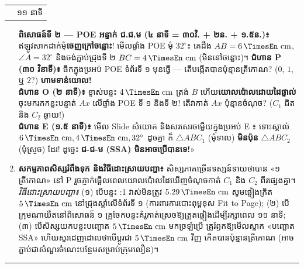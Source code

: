 \documentclass[a4paper,12pt]{article}
\makeatletter
\newcommand{\en}[1]{{\TimesEn #1}}
\newcommand{\enbf}[1]{{\TimesEn\textbf{#1}}}
\newcommand{\unit}[1]{\,\text{\en{#1}}}
\newcommand{\tri}[1]{\ensuremath{\triangle #1}}
\newcommand{\ang}[1]{\ensuremath{\angle #1}}
\newenvironment{phasebox}[3]{%
  \needspace{2.2cm}%
  \begin{tcolorbox}[
    enhanced, sharp corners, colback=headgray, colframe=black,
    boxrule=1.0pt, top=4pt, bottom=4pt, left=9pt, right=9pt,
    before skip=7pt, after skip=3pt
  ]%
    \renewcommand{\arraystretch}{1.0}%
    \begin{tabular*}{\linewidth}{@{}>{\raggedright\arraybackslash}p{13.60cm}@{\extracolsep{\fill}}r@{}}
      {\muol\fontsize{11pt}{17.5pt}\selectfont #1} & {\fontsize{10.5pt}{15pt}\selectfont\en{#2 |} #3}%
    \end{tabular*}%
  \end{tcolorbox}%
  \begingroup\fontsize{11.5pt}{18.2pt}\selectfont
}{%
  \par\endgroup\vspace{3pt}\hrule height 0.5pt\vspace{5pt}%
}
\makeatother
\begin{document}
\begin{phasebox}{ជំហានទី ៣ \enbf{(}ក\enbf{)} \enbf{--- E2 Explore}៖ ពិសោធន៍ទី ១ ចង្កឹះគន្លឹះ \enbf{\&} ពិសោធន៍ទី ២ \enbf{POE} អន្ទាក់ \enbf{SSA}}{11--22 min}{១១ នាទី}
\begin{enumerate}[leftmargin=0.45cm, topsep=2pt, itemsep=4pt, parsep=0pt]
\begin{scriptbox}
        \textbf{ពិសោធន៍ទី ២ — \en{POE} អន្ទាក់ ជ.ជ.ម (៤ នាទី = ៣០វិ. + ២ន. + ១.៥ន.)៖} ឥឡូវសាកដាក់មុំ\textbf{ចេញក្រៅចន្លោះ}! មើលផ្ទាំង \en{POE} មុំ $32^\circ$៖ គេដឹង $AB = 6\unit{cm}$, $\ang{A} = 32^\circ$ និងចង់ភ្ជាប់ជ្រុងទី ២ $BC = 4\unit{cm}$ (មិននៅចន្លោះ)។ \textbf{ជំហាន P (៣០ វិនាទី)៖} ធីកក្នុងប្រអប់ \en{POE} ទំព័រទី ១ មុនធ្វើ — តើបង្កើតបានប៉ុន្មានត្រីកោណ? ($0$, $1$, ឬ $2$?) \textbf{ហាមទាន់យោល!} \\
        \textbf{ជំហាន O (២ នាទី)៖} ខ្ទាស់បន្ទះ $4\unit{cm}$ ត្រង់ $B$ ហើយ\textbf{យោលប៉ោលដោយដៃផ្ទាល់}ចុះមករកកន្លះបន្ទាត់ $Ax$ លើផ្ទាំង \en{POE} ទី ១ និងទី ២! តើវាកាត់ $Ax$ ប៉ុន្មានចំណុច? ($C_1$ ជិត និង $C_2$ ឆ្ងាយ!) \\
        \textbf{ជំហាន E (១.៥ នាទី)៖} មើល \en{Slide} សំយោគ និងសរសេរចម្លើយក្នុងប្រអប់ \en{E} ៖ ទោះស្គាល់ $6\unit{cm}, 4\unit{cm}, 32^\circ$ ដូចគ្នា ក៏ $\tri{ABC_1}$ (មុំទាល) \textbf{មិនប៉ុន} $\tri{ABC_2}$ (មុំស្រួច) ដែរ! ដូច្នេះ \textbf{ជ-ជ-ម (\en{SSA}) មិនអាចប្រើបានទេ!}»
      \end{scriptbox}
    \item \textbf{សកម្មភាពសិស្សរំពឹងទុក និងវិធីដោះស្រាយបញ្ហា៖} សិស្សភាគច្រើនទស្សន៍ទាយថាបាន «១ ត្រីកោណ» នៅ \en{P} រួចភ្ញាក់ផ្អើលពេលយោលប៉ោលដៃឃើញចំណុចកាត់ $C_1$ និង $C_2$ ពីរផ្សេងគ្នា។ \textit{វិធីដោះស្រាយបញ្ហា៖} (១) បើបន្ទះ \en{1:1} វាស់មិនត្រូវ $5.29\unit{cm}$ សូមផ្ទៀងក្រិត $5\unit{cm}$ នៅជ្រុងស្ដាំលើទំព័រទី ១ (ការពារការបោះពុម្ពខុស \en{Fit to Page}); (២) បើក្រុមណាយឺតនៅពិសោធន៍ ១ គ្រូចែកបន្ទះគំរូកាត់ស្រេចឱ្យត្រួតផ្ទៀងដើម្បីរក្សាពេល ១១ នាទី; (៣) បើសិស្សយកបន្ទះបញ្ឆោត $5\unit{cm}$ មកច្រឡំប្រើ គ្រូរំឭកឱ្យមើលស្លាក «បញ្ឆោត \en{SSA}» ហើយសួរដេញដោលថាបើប្ដូរជា $5\unit{cm}$ វិញ កើតបានប៉ុន្មានត្រីកោណ (អាចភ្ជាប់ជាសំណួរចំណេះបន្ថែមសម្រាប់ក្រុមលឿន)។
  \end{enumerate}
\end{phasebox}
\end{document}
